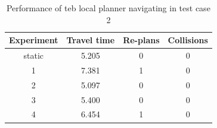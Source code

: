 \begin{table}[H]
    \centering
    \begin{tabular}{cccc}
        \textbf{Experiment} & \textbf{Travel time} & \textbf{Re-plans} & \textbf{Collisions} \\\toprule
        static & 5.205 & 0 & 0 \\
             1 & 7.381 & 1 & 0 \\
             2 & 5.097 & 0 & 0 \\
             3 & 5.400 & 0 & 0 \\
             4 & 6.454 & 1 & 0 \\
    \end{tabular}
    \caption{Performance of teb local planner navigating in test case 2}\label{tab:perfomance_teb_test_case_2}
\end{table}

